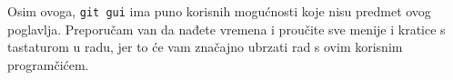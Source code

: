 Osim ovoga, \verb+git gui+ ima puno korisnih mogućnosti koje nisu predmet ovog poglavlja.
Preporučam van da nađete vremena i proučite sve menije i kratice s tastaturom u radu, jer to će vam značajno ubrzati rad s ovim korisnim programčićem.



